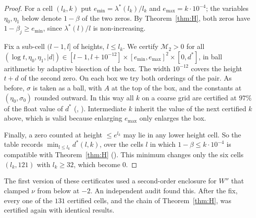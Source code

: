 \begin{proof}
For a cell $(l_k,k)$ put $e_{\min} = \lambda^*(l_k)/l_k$ and $e_{\max} = k\cdot10^{-4}$; the variables $\eta_0,\eta_1$ below denote $1-\beta$ of the two zeros.
By Theorem~\ref{thm:H}, both zeros have $1-\beta_j \ge e_{\min}$, since $\lambda^*(l)/l$ is non-increasing.

Fix a sub-cell $(l-1, l]$ of heights, $l \le l_k$.
We certify $\mathcal M_2 > 0$ for all $(\log t, \eta_0, \eta_1, |d|) \in [l-1, l + 10^{-12}] \times [e_{\min},e_{\max}]^2 \times [0, d^*]$, in ball arithmetic by adaptive bisection of the box.
The width $10^{-12}$ covers the height $t+d$ of the second zero.
On each box we try both orderings of the pair.
As before, $\sigma$ is taken as a ball, with $A$ at the top of the box, and the constants at $(\eta_0,\sigma_0)$ rounded outward.
In this way all $k$ on a coarse grid are certified at $97\%$ of the float value of $d^*$ (, ).
Intermediate $k$ inherit the value of the next certified $k$ above, which is valid because enlarging $e_{\max}$ only enlarges the box.

Finally, a zero counted at height $\le e^{l_k}$ may lie in any lower height cell.
So the table records $\min_{l\le l_k} d^*(l,k)$, over the cells $l$ in which $1-\beta \le k\cdot10^{-4}$ is compatible with Theorem~\ref{thm:H} ().
This minimum changes only the six cells $(l_k, 121)$ with $l_k \ge 32$, which become $0$.
\end{proof}

The first version of these certificates used a second-order enclosure for $W''$ that clamped $\nu$ from below at $-2$.
An independent audit found this.
After the fix, every one of the $131$ certified cells, and the chain of Theorem~\ref{thm:H}, was certified again with identical results.
